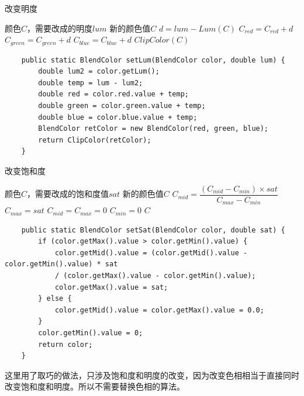 \begin{algorithm}
	\caption{改变明度}
	\begin{algorithmic}[1] %
		\Require  颜色$C$，需要改成的明度$lum$
		\Ensure 新的颜色值$C$
		\State $d=lum - Lum(C)$
		\State $C_{red}=C_{red}+d$
		\State  $C_{green}=C_{green}+d$
		\State $C_{blue}=C_{blue}+d$
		\State \Return $ClipColor(C)$
		\EndFunction
	\end{algorithmic}
\end{algorithm}
\begin{lstlisting}
	public static BlendColor setLum(BlendColor color, double lum) {
		double lum2 = color.getLum();
		double temp = lum - lum2;
		double red = color.red.value + temp;
		double green = color.green.value + temp;
		double blue = color.blue.value + temp;
		BlendColor retColor = new BlendColor(red, green, blue);
		return ClipColor(retColor);
	}
\end{lstlisting}
\begin{algorithm}
	\caption{改变饱和度}
	\begin{algorithmic}[1] %
		\Require  颜色$C$，需要改成的饱和度值$sat$
		\Ensure 新的颜色值$C$
		\State $C_{mid}=\dfrac{(C_{mid}-C_{min})\times sat}{C_{max}-C_{min}}$
		\State $C_{max}=sat$
		\Else
		\State $C_{mid}=C_{max}=0$
		\EndIf
		\State $C_{min}=0$
		\State \Return $C$
		\EndFunction
	\end{algorithmic}
\end{algorithm}
\begin{lstlisting}
	public static BlendColor setSat(BlendColor color, double sat) {
		if (color.getMax().value > color.getMin().value) {
			color.getMid().value = (color.getMid().value - color.getMin().value) * sat
			/ (color.getMax().value - color.getMin().value);
			color.getMax().value = sat;
		} else {
			color.getMid().value = color.getMax().value = 0.0;
		}
		color.getMin().value = 0;
		return color;
	}
\end{lstlisting}
\newpage
\begin{notice}
	\item 这里用了取巧的做法，只涉及饱和度和明度的改变，因为改变色相相当于直接同时改变饱和度和明度。所以不需要替换色相的算法。
\end{notice}
 

